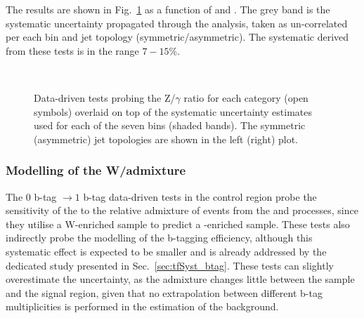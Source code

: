 The results are shown in Fig.~\ref{fig:closurePhoToMuMu} as a function
of \scalht and \njet.  The grey band is the systematic uncertainty
propagated through the analysis, taken as un-correlated per each
\scalht bin and jet topology (symmetric/asymmetric). The systematic
derived from these tests is in the range $7-15\%$.

\begin{figure}[h!]
  \begin{center}
    ~~
    \caption{Data-driven tests probing the Z/$\gamma$ ratio for each
      \njet category (open symbols) overlaid on top of the systematic
      uncertainty estimates used for each of the seven \scalht bins
      (shaded bands). 
      The symmetric (asymmetric) jet topologies are shown in the left (right) plot.      
    }
    \label{fig:closurePhoToMuMu}
  \end{center} 
\end{figure}

\subsubsection*{Modelling of the W/\ttbar admixture}
\label{sec:tfSyst_WttAd}

The $0$ b-tag $\rightarrow1$ b-tag data-driven tests in the \mj
control region probe the sensitivity of the \TFs to the
relative admixture of events from the \wj and \ttbar processes,
since they utilise a W-enriched sample to predict a \ttbar-enriched
sample.  These tests also indirectly probe the modelling of the
b-tagging efficiency, although this systematic effect is expected to
be smaller and is already addressed by the dedicated study presented
in Sec.~\ref{sec:tfSyst_btag}.  These tests can slightly overestimate
the uncertainty, as the admixture changes little between the
\mj sample and the signal region, given that no extrapolation between
different b-tag multiplicities is performed in the estimation of the
background. 

